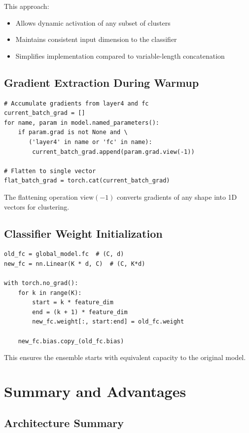 \documentclass[11pt,a4paper]{article}
\begin{document}
This approach:
\begin{itemize}
    \item Allows dynamic activation of any subset of clusters
    \item Maintains consistent input dimension to the classifier
    \item Simplifies implementation compared to variable-length concatenation
\end{itemize}

\subsection{Gradient Extraction During Warmup}

\begin{lstlisting}[caption={Gradient Extraction}]
# Accumulate gradients from layer4 and fc
current_batch_grad = []
for name, param in model.named_parameters():
    if param.grad is not None and \
       ('layer4' in name or 'fc' in name):
        current_batch_grad.append(param.grad.view(-1))

# Flatten to single vector
flat_batch_grad = torch.cat(current_batch_grad)
\end{lstlisting}

The flattening operation $\text{view}(-1)$ converts gradients of any shape into 1D vectors for clustering.

\subsection{Classifier Weight Initialization}

\begin{lstlisting}[caption={Weight Expansion}]
old_fc = global_model.fc  # (C, d)
new_fc = nn.Linear(K * d, C)  # (C, K*d)

with torch.no_grad():
    for k in range(K):
        start = k * feature_dim
        end = (k + 1) * feature_dim
        new_fc.weight[:, start:end] = old_fc.weight
    
    new_fc.bias.copy_(old_fc.bias)
\end{lstlisting}

This ensures the ensemble starts with equivalent capacity to the original model.

\section{Summary and Advantages}

\subsection{Architecture Summary}
\end{document}
